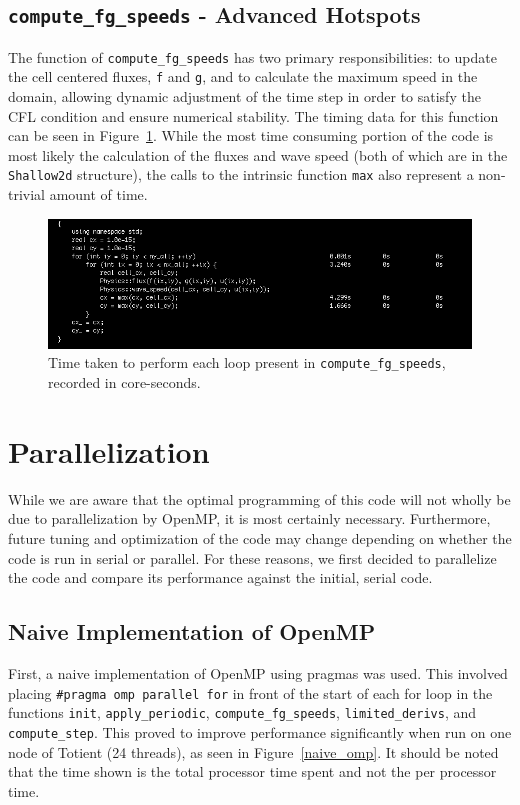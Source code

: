 \documentclass[12pt]{article}
\begin{document}
		\subsection{\texttt{compute\_fg\_speeds} - Advanced Hotspots}
		The function of \texttt{compute\_fg\_speeds} has two primary responsibilities: to update the cell centered fluxes, \texttt{f} and \texttt{g}, and to calculate the maximum speed in the domain, allowing dynamic adjustment of the time step in order to satisfy the CFL condition and ensure numerical stability. The timing data for this function can be seen in Figure~\ref{init_compute_fg_speeds}. While the most time consuming portion of the code is most likely the calculation of the fluxes and wave speed (both of which are in the \texttt{Shallow2d} structure), the calls to the intrinsic function \texttt{max} also represent a non-trivial amount of time. 	
		\begin{figure}[h]
			\begin{center}
				\includegraphics[width=0.7\columnwidth]{init_compute_fg_speeds}
				\caption{Time taken to perform each loop present in \texttt{compute\_fg\_speeds}, recorded in core-seconds.}
				\label{init_compute_fg_speeds}
			\end{center}
		\end{figure}	
		
		\FloatBarrier
	\section{Parallelization}
	While we are aware that the optimal programming of this code will not wholly be due to parallelization by OpenMP, it is most certainly necessary. Furthermore, future tuning and optimization of the code may change depending on whether the code is run in serial or parallel. For these reasons, we first decided to parallelize the code and compare its performance against the initial, serial code.
		\subsection{Naive Implementation of OpenMP}
		First, a naive implementation of OpenMP using pragmas was used. This involved placing \texttt{\#pragma omp parallel for} in front of the start of each for loop in the functions \texttt{init}, \texttt{apply\_periodic}, \texttt{compute\_fg\_speeds}, \texttt{limited\_derivs}, and \texttt{compute\_step}. This proved to improve performance significantly when run on one node of Totient (24 threads), as seen in Figure~\ref{naive_omp}. It should be noted that the time shown is the total processor time spent and not the per processor time.
		
\end{document}
